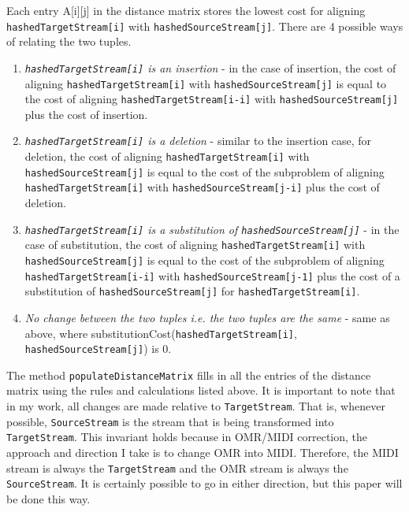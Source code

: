 Each entry A[i][j] in the distance matrix stores the lowest cost for aligning\\
 \texttt{hashedTargetStream[i]} with \texttt{hashedSourceStream[j]}. There are 4 possible ways of relating the two tuples. 
\begin{enumerate}
\item \textit{\texttt{hashedTargetStream[i]} is an insertion} - in the case of insertion, the cost of aligning \texttt{hashedTargetStream[i]} with \texttt{hashedSourceStream[j]} is equal to the cost of aligning \texttt{hashedTargetStream[i-i]} with \texttt{hashedSourceStream[j]} plus the cost of insertion.

\item \textit{\texttt{hashedTargetStream[i]} is a deletion} - similar to the insertion case, for deletion, the cost of aligning \texttt{hashedTargetStream[i]} with \texttt{hashedSourceStream[j]} is equal to the cost of the subproblem of aligning \texttt{hashedTargetStream[i]}  with \texttt{hashedSourceStream[j-i]} plus the cost of deletion.

\item \textit{\texttt{hashedTargetStream[i]} is a substitution of \texttt{hashedSourceStream[j]}} - in the case of substitution, the cost of aligning \texttt{hashedTargetStream[i]} with \texttt{hashedSourceStream[j]} is equal to the cost of the subproblem of aligning \texttt{hashedTargetStream[i-i]} with \texttt{hashedSourceStream[j-1]} plus the cost of a substitution of  \texttt{hashedSourceStream[j]} for \texttt{hashedTargetStream[i]}.
 
\item \textit{No change between the two tuples i.e. the two tuples are the same} - same as above, where \- substitutionCost(\texttt{hashedTargetStream[i]}, \texttt{hashedSourceStream[j]}) is 0.
\end{enumerate}

The method \texttt{populateDistanceMatrix} fills in all the entries of the distance matrix using the rules and calculations listed above. It is important to note that in my work, all changes are made relative to \texttt{TargetStream}. That is, whenever possible, \texttt{SourceStream} is the stream that is being transformed into \texttt{TargetStream}. This invariant holds because in OMR/MIDI correction, the approach and direction I take is to change OMR into MIDI. Therefore, the MIDI stream is always the \texttt{TargetStream} and the OMR stream is always the \texttt{SourceStream}. It is certainly possible to go in either direction, but this paper will be done this way. 

